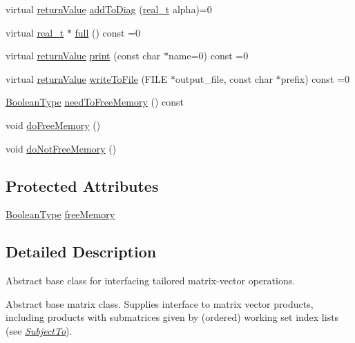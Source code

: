 \begin{DoxyCompactItemize}
\item 
virtual \hyperlink{_message_handling_8hpp_a81d556f613bfbabd0b1f9488c0fa865e}{return\+Value} \hyperlink{class_matrix_a7ee8d1b4ef0d5d5fb34342ea1889382f}{add\+To\+Diag} (\hyperlink{qp_o_a_s_e_s__wrapper_8h_a0d00e2b3dfadee81331bbb39068570c4}{real\+\_\+t} alpha)=0
\item 
virtual \hyperlink{qp_o_a_s_e_s__wrapper_8h_a0d00e2b3dfadee81331bbb39068570c4}{real\+\_\+t} $\ast$ \hyperlink{class_matrix_ac53a5bbb05c6a928af17e0d88220ff63}{full} () const =0
\item 
virtual \hyperlink{_message_handling_8hpp_a81d556f613bfbabd0b1f9488c0fa865e}{return\+Value} \hyperlink{class_matrix_acc4e1dc7fa487a0c2638d88236fe35f8}{print} (const char $\ast$name=0) const =0
\item 
virtual \hyperlink{_message_handling_8hpp_a81d556f613bfbabd0b1f9488c0fa865e}{return\+Value} \hyperlink{class_matrix_a1504bb1a207b6e5d3320289e4af84400}{write\+To\+File} (F\+I\+LE $\ast$output\+\_\+file, const char $\ast$prefix) const =0
\item 
\hyperlink{_types_8hpp_a20f82124c82b6f5686a7fce454ef9089}{Boolean\+Type} \hyperlink{class_matrix_a35c1d03c91df5ae7460be2383f7a2940}{need\+To\+Free\+Memory} () const
\item 
void \hyperlink{class_matrix_a9b1c0fc70cad1b88d6e6ab960bda478d}{do\+Free\+Memory} ()
\item 
void \hyperlink{class_matrix_a1a25e70b54e2101eb2d0c2b8a26c3d97}{do\+Not\+Free\+Memory} ()
\end{DoxyCompactItemize}
\subsection*{Protected Attributes}
\begin{DoxyCompactItemize}
\item 
\hyperlink{_types_8hpp_a20f82124c82b6f5686a7fce454ef9089}{Boolean\+Type} \hyperlink{class_matrix_a4589bd2bde0875fe3ac82f1f97684c67}{free\+Memory}
\end{DoxyCompactItemize}


\subsection{Detailed Description}
Abstract base class for interfacing tailored matrix-\/vector operations. 

Abstract base matrix class. Supplies interface to matrix vector products, including products with submatrices given by (ordered) working set index lists (see {\itshape \hyperlink{class_subject_to}{Subject\+To}}).

